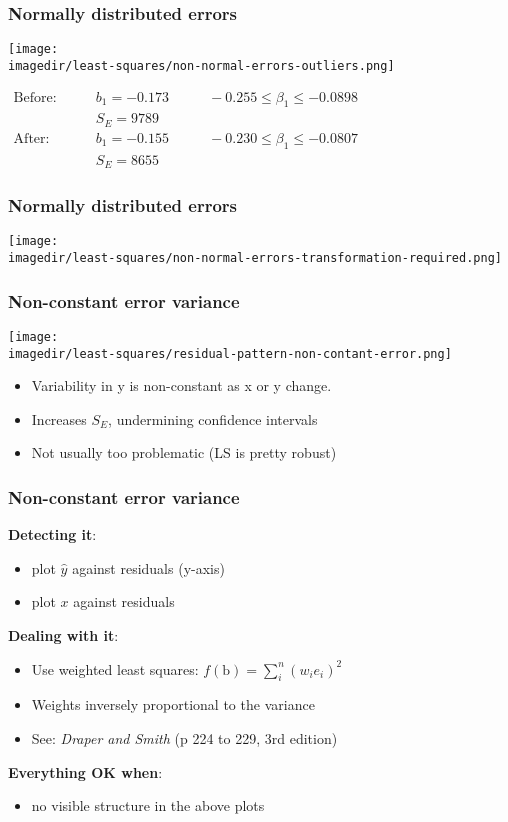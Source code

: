\begin{frame}\frametitle{Normally distributed errors}
	\begin{center}
		\texttt{[image: \\imagedir/least-squares/non-normal-errors-outliers.png]}
	\end{center}
	$ 
	\begin{array}{rcccl}
		\text{Before}: \qquad & b_1 = -0.173 & \qquad -0.255 \leq \beta_1 \leq -0.0898 \\
		& S_E = 9789\\
		\text{After}: \qquad & b_1 = -0.155 & \qquad -0.230 \leq \beta_1 \leq -0.0807 \\
		&S_E = 8655 
	\end{array}
	$
\end{frame}

\begin{frame}\frametitle{Normally distributed errors}
	\begin{center}
		\texttt{[image: \\imagedir/least-squares/non-normal-errors-transformation-required.png]}
	\end{center}
\end{frame}

\begin{frame}\frametitle{Non-constant error variance}
	\begin{center}
		\texttt{[image: \\imagedir/least-squares/residual-pattern-non-contant-error.png]}
	\end{center}
	\begin{itemize}
		\item	Variability in y is non-constant as x or y change. 
		\item	Increases $S_E$, undermining confidence intervals 
		\item	Not usually too problematic (LS is pretty robust) 
	\end{itemize}
\end{frame}

\begin{frame}\frametitle{Non-constant error variance}
	
	\textbf{Detecting it}:
	\begin{itemize}
		\item	plot $\hat{y}$ against residuals (y-axis) 
		\item	plot $x$ against residuals 
	\end{itemize}
	
	\textbf{Dealing with it}: 
	\begin{itemize}
		\item	Use weighted least squares: $f(\mathrm{b}) = \sum_i^n{(w_ie_i)^2}$ 
		\item	Weights inversely proportional to the variance 
		\item	See: \emph{Draper and Smith} (p 224 to 229, 3rd edition) 
	\end{itemize}
	
	\textbf{Everything OK when}: 
	\begin{itemize}
		\item	no visible structure in the above plots 
	\end{itemize}
\end{frame}

